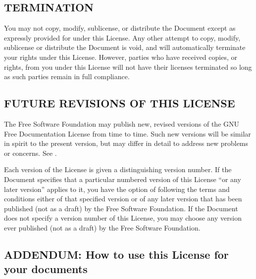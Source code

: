 \documentclass[a4paper,german,10pt,twoside]{book}
\begin{document}
{\begin{appendix}
{\subsection*{TERMINATION}
\label{termination}

You may not copy, modify, sublicense, or distribute the Document except as expressly provided for
under this License.	 Any other attempt to copy, modify, sublicense or distribute the Document is
void, and will automatically terminate your rights under this License.	However, parties who have
received copies, or rights, from you under this License will not have their licenses terminated so
long as such parties remain in full compliance.


\subsection*{FUTURE REVISIONS OF THIS LICENSE}
\label{future}

The Free Software Foundation may publish new, revised versions of the GNU Free Documentation
License from time to time.	Such new versions will be similar in spirit to the present version, but
may differ in detail to address new problems or concerns.  See .

Each version of the License is given a distinguishing version number. If the Document specifies
that a particular numbered version of this License ``or any later version'' applies to it, you have
the option of following the terms and conditions either of that specified version or of any later
version that has been published (not as a draft) by the Free Software Foundation.  If the Document
does not specify a version number of this License, you may choose any version ever published (not
as a draft) by the Free Software Foundation.


\subsection*{ADDENDUM: How to use this License for your documents}

}
\end{appendix}}
\end{document}
